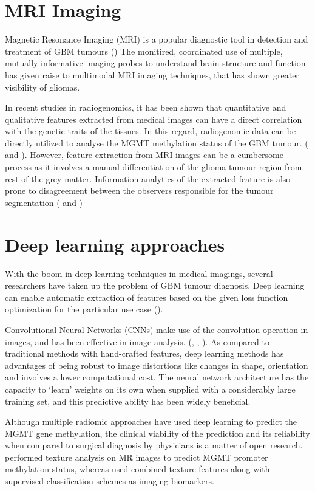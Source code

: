 \section{MRI Imaging}
Magnetic Resonance Imaging (MRI) is a popular diagnostic tool in detection and treatment of GBM tumours (\cite{MRI_1}) The monitired, coordinated use of multiple, mutually informative imaging probes to understand brain structure and function has given raise to multimodal MRI imaging techniques, that has shown greater visibility of gliomas. 

\vspace*{3mm} 
In recent studies in radiogenomics, it has been shown that quantitative and qualitative features extracted from medical images can have a direct correlation with the genetic traits of the tissues. In this regard, radiogenomic data can be directly utilized to analyse the MGMT methylation status of the GBM tumour. (\cite{MRI_2} and \cite{MRI_3}). However, feature extraction from MRI images can be a cumbersome process as it involves a manual differentiation of the glioma tumour region from rest of the grey matter. Information analytics of the extracted feature is also prone to disagreement between the observers responsible for the tumour segmentation (\cite{MRI_4} and \cite{MRI_5})

\section{Deep learning approaches}

With the boom in deep learning techniques in medical imagings, several researchers have taken up the problem of GBM tumour diagnosis. Deep learning can enable automatic extraction of features based on the given loss function optimization for the particular use case (\cite{DL_1}). 

\vspace*{3mm} 
Convolutional Neural Networks (CNNs) make use of the convolution operation in images, and has been effective in image analysis. (\cite{DL_2}, \cite{DL_3}, \cite{DL_4}). As compared to traditional methods with hand-crafted features, deep learning methods has advantages of being robust to image distortions like changes in shape, orientation and involves a lower computational cost. The neural network architecture has the capacity to `learn' weights on its own when supplied with a considerably large training set, and this predictive ability has been widely beneficial. 

\vspace*{3mm} 
Although multiple radiomic approaches have used deep learning to predict the MGMT gene methylation, the clinical viability of the prediction and its reliability when compared to surgical diagnosis by physicians is a matter of open research. \cite{DL_5} performed texture analysis on MR images to predict MGMT promoter methylation status, whereas \cite{DL_6} used combined texture features along with supervised classification schemes as imaging biomarkers. 

